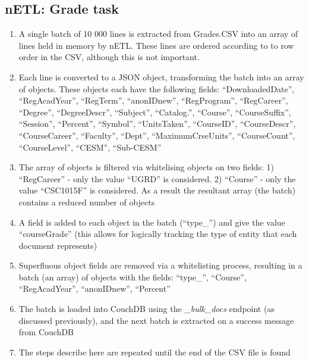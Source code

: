 \subsection*{nETL: Grade task}
\begin{enumerate}
    \item A single batch of 10 000 lines is extracted from Grades.CSV into an array of lines held in memory by nETL. These lines are ordered according to to row order in the CSV, although this is not important.
    \item Each line is converted to a JSON object, transforming the batch into an array of objects. These objects each have the following fields: ``DownloadedDate'', ``RegAcadYear'', ``RegTerm'', ``anonIDnew'', ``RegProgram'', ``RegCareer'', ``Degree'', ``DegreeDescr'', ``Subject'', ``Catalog.'', ``Course'', ``CourseSuffix'', ``Session'', ``Percent'', ``Symbol'', ``UnitsTaken'', ``CourseID'', ``CourseDescr'', ``CourseCareer'', ``Faculty'', ``Dept'', ``MaximumCrseUnits'', ``CourseCount'', ``CourseLevel'', ``CESM'', ``Sub-CESM''
    \item The array of objects is filtered via whitelising objects on two fields: 1) ``RegCareer'' - only the value ``UGRD'' is considered. 2) ``Course'' - only the value ``CSC1015F'' is considered. As a result the resultant array (the batch) contains a reduced number of objects
    \item A field is added to each object in the batch (``type\_'') and give the value ``courseGrade'' (this allows for logically tracking the type of entity that each document represents)
    \item Superfluous object fields are removed via a whitelisting process, resulting in a batch (an array) of objects with the fields: ``type\_'', ``Course'', ``RegAcadYear'', ``anonIDnew'', ``Percent''
    \item The batch is loaded into CouchDB using the \textit{\_bulk\_docs} endpoint (as discussed previously), and the next batch is extracted on a success message from CouchDB
    \item The steps describe here are repeated until the end of the CSV file is found
\end{enumerate}

